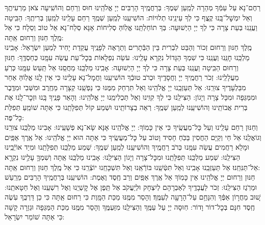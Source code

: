 \documentclass[twoside, openany, parskip=half, 11pt]{book}
\begin{document}
רַחֶם־נָא עַל עַמְּֿךָ מְהֵרָה לְמַֽעַן שְׁמֶךָ: בְּרַחֲמֶֽיךָ הָרַבִּים יְיָ אֱלֹהֵֽינוּ חוּס וְרַחֵם וְהוֹשִֽׁיעָה צֹאן מַרְעִיתֶֽךָ וְאַל יִמְשׇׁל־בָּֽנוּ קֶֽצֶף כִּי לְךָ עֵינֵֽינוּ תְלוּיוֹת: הוֹשִׁיעֵֽנוּ לְמַֽעַן שְׁמֶֽךָ רַחֵם עָלֵֽינוּ לְמַֽעַן בְּרִיתֶֽךָ: הַבִּֽיטָה וַעֲנֵֽנוּ בְּעֵת צָרָה כִּי לְךָ יְיָ הַיְשׁוּעָה: בְּךָ תוֹחַלְתֵּֽנוּ אֱלֽוֹהַּ סְלִיחוֹת אָנָּא סְלַח־נָא אֵל טוֹב וְסַלָח כִּי אֵל מֶֽלֶךְ חַנּוּן וְרַחוּם אַֽתָּה:\\
מֶֽלֶךְ חַנּוּן וְרַחוּם זְכוֹר וְהַבֵּט לִבְרִית בֵּין הַבְּֿתָרִים וְתֵרָאֶה לְפָנֶֽיךָ עֲקֵדַת יָחִיד לְמַעַן יִשְׂרָאֵל: אָבִֽינוּ מַלְכֵּֽנוּ חׇנֵּֽנוּ וְעֲנֵֽנוּ כִּי שִׁמְךָ הַגָּדוֹל נִקְרָא עָלֵֽינוּ: עֹשֵׂה נִפְלָאוֹת בְּכׇל־עֵת עֲשֵׂה עִמָּֽנוּ כְּחַסְדֶּֽךָ: חַנּוּן וְרַחוּם הַבִּֽיטָה וַעֲנֵֽנוּ בְּעֵת צָרָה כִּי לְךָ יְיָ הַיְשׁוּעָה: אָבִֽינוּ מַלְכֵּֽנוּ מַחֲסֵֽנוּ אַל תַּֽעַשׂ עִמָּֽנוּ כְּרֹֽעַ מַעֲלָלֵֽינוּ: זְכֹר רַחֲמֶֽיךָ יְיָ וְחֲסָדֶֽיךָ וּכְרֹב טוּבְֿךָ הוֹשִׁיעֵֽנוּ וַחֲמׇל־נָא עָלֵֽינוּ כִּי אֵין לָֽנוּ אֱלֽוֹהַּ אַחֵר מִבַּלְעָדֶיךָ צוּרֵֽנוּ: אַל תַּעַזְבֵֽנוּ יְיָ אֱלֹהֵֽינוּ וְאַל תִּרְחַק מִמֶּנּוּ כִּי נַפְשֵֽׁנוּ קְצָרָה מֵחֶֽרֶב וּמִשְּׁבִי וּמִדֶּֽבֶר וּמִמַּגֵּפָה וּמִכָּל צָרָה וְיָגוֹן: הַצִּילֵֽנוּ כִּי לְךָ קִוִּֽינוּ וְאַל תַּכְלִימֵֽנוּ יְיָ אֱלֹהֵֽינוּ: וְהָאֵר פָּנֶֽיךָ בָּֽנוּ וּזְכׇר־לָֽנוּ אֶת בְּרִית אֲבוֹתֵֽינוּ וְהוֹשִׁיעֵֽנוּ לְמַֽעַן שְׁמֶֽךָ: רְאֵה בְצָרוֹתֵֽינוּ וּשְׁמַע קוֹל תְּפִלָּתֵֽנוּ כִּי אַתָּה שׁוֹמֵֽעַ תְּפִלַּת כׇּל־פֶּה:\\
וְחַנּוּן רַחֵם עָלֵֽינוּ וְעַל כׇּל־מַעֲשֶֽׂיךָ כִּי אֵין כָּמֽוֹךָ: יְיָ אֱלֹהֵֽינוּ אָנָּא שָׂא־נָא פְשָׁעֵֽינוּ: אָבִינוּ מַלְכֵּֽנוּ צוּרֵֽנוּ וְגוֹאֲלֵֽנוּ אֵל חַי וְקַיָּם הַחֲסִין בַּכֹּֽחַ חָסִיד וָטוֹב עַל כׇּל־מַעֲשֶֽׂיךָ כִּי אַתָּה הוּא יְיָ אֱלֹהֵֽינוּ: אֵל אֶֽרֶךְ אַפַּֽיִם וּמָלֵא רַחֲמִים עֲשֵׂה עִמָּֽנוּ כְּרֹב רַחֲמֶֽיךָ וְהוֹשִׁיעֵֽנוּ לְמַֽעַן שְׁמֶֽךָ: שְׁמַע מַלְכֵּֽנוּ תְּפִלָּתֵֽנוּ וּמִיַד אוֹיְֿבֵֽינוּ הַצִּילֵֽנוּ: שְׁמַע מַלְכֵּֽנוּ תְּפִלָּתֵֽנוּ וּמִכׇּל־צָרָה וְיָגוֹן הַצִּילֵֽנוּ: אָבִֽינוּ מַלְכֵּֽנוּ אַֽתָּה וְשִׁמְךָ֛ עָלֵ֥ינוּ נִקְרָ֖א אַל־תַּנִּחֵֽנוּ׃ אַל תַּעַזְבֵֽנוּ אָבִֽינוּ וְאַל תִּטְּֿשֵֽׁנוּ בּוֹרְֿאֵֽנוּ וְאַל תִּשְׁכָּחֵֽנוּ יוֹצְֿרֵֽנוּ כִּי אֵל מֶֽלֶךְ חַנּוּן וְרַחוּם אַֽתָּה:\\
חַנּוּן וְרַחוּם יְיָ אֱלֹהֵֽינוּ אֵין כָּמֽוֹךָ אֵל אֶֽרֶךְ אַפַּֽיִם וְרַב חֶֽסֶד וֶאֶמֶת: הוֹשִׁיעֵֽנוּ בְּרַחֲמֶֽיךָ הָרַבִּים מֵרַֽעַשׁ וּמֵרֹֽגֶז הַצִּילֵֽנוּ: זְכֹר לַעֲבָדֶֽיךָ לְאַבְרָהָם לְיִצְחָק וּלְיַעֲקֹב אַל תֵּֽפֶן אֶל קׇשְׁיֵֽנוּ וְאֶל רִשְׁעֵֽנוּ וְאֶל חַטָּאתֵֽנוּ: 
שׁ֚וּב מֵחֲר֣וֹן אַפֶּ֔ךָ וְהִנָּחֵ֥ם עַל־הָרָעָ֖ה לְעַמֶּֽךָ׃ וְהָסֵר מִמֶּֽנּוּ מַכַּת הַמָּֽוֶת כִּי רַחוּם אַֽתָּה כִּי כֵן דַּרְכֶּֽךָ עֹֽשֶׂה חֶֽסֶד חִנָּם בְּכׇל־דוֹר וָדוֹר: חֽוּסָה יְיָ עַל עַמֶּֽךָ וְהַצִּילֵֽנוּ מִזַּעְמֶּֽךָ וְהָסֵר מִמֶּֽנּוּ מַכַּת הַמַּגֵּפָה וּגְזֵרָה קָשָׁה כִּי אַתָּה שׁוֹמֵר יִשְׂרָאֵל:
\end{document}
